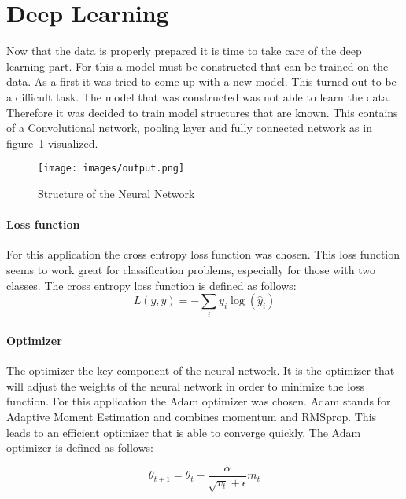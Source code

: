 \section{Deep Learning}
 Now that the data is properly prepared it is time to take care of the deep learning part. For this a model must be constructed that can be trained on the data. As a first it was tried to come up with a new model. This turned out to be a difficult task. The model that was constructed was not able to learn the data. Therefore it was decided to train model structures that are known. This contains of a Convolutional network, pooling layer and fully connected network as in figure~\ref{fig:neuralNetwork} visualized.  


\begin{figure}[h] %
    \centering %
    \texttt{[image: images/output.png]}
    \caption{Structure of the Neural Network} %
    \label{fig:neuralNetwork} %
\end{figure}

\paragraph{Loss function}
For this application the cross entropy loss function was chosen. This loss function seems to work great for classification problems, especially for those with two classes. The cross entropy loss function is defined as follows:
\begin{equation}
    L(y, \hat{y}) = -\sum_{i} y_i \log(\hat{y}_i)
\end{equation}


\paragraph{Optimizer}
The optimizer the key component of the neural network. It is the optimizer that will adjust the weights of the neural network in order to minimize the loss function. For this application the Adam optimizer was chosen. Adam stands for Adaptive Moment Estimation and combines momentum and RMSprop. This leads to an efficient optimizer that is able to converge quickly. The Adam optimizer is defined as follows:

\begin{equation}
    \theta_{t+1} = \theta_t - \frac{\alpha}{\sqrt{v_t} + \epsilon} m_t
\end{equation}


